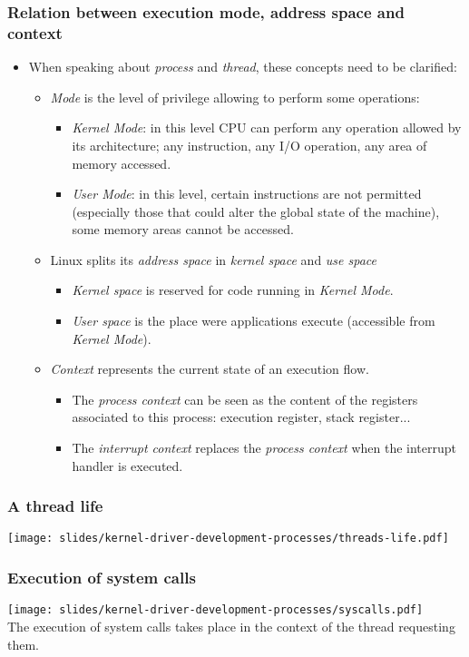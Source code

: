 \begin{frame}
  \frametitle{Relation between execution mode, address space and context}
  \begin{itemize}
  \item When speaking about \emph{process} and \emph{thread}, these
    concepts need to be clarified:
    \begin{itemize}
    \item \emph{Mode} is the level of privilege allowing to perform
      some operations:
      \begin{itemize}
      \item \emph{Kernel Mode}: in this level CPU can perform any
        operation allowed by its architecture; any instruction, any
        I/O operation, any area of memory accessed.
      \item \emph{User Mode}: in this level, certain instructions are
        not permitted (especially those that could alter the global
        state of the machine), some memory areas cannot be accessed.
      \end{itemize}
    \item Linux splits its \emph{address space} in \emph{kernel space}
      and \emph{use space}
      \begin{itemize}
      \item \emph{Kernel space} is reserved for code running in
        \emph{Kernel Mode}.
      \item \emph{User space} is the place were applications execute
        (accessible from \emph{Kernel Mode}).
      \end{itemize}
    \item \emph{Context} represents the current state of an execution flow.
      \begin{itemize}
      \item The \emph{process context} can be seen as the content of
        the registers associated to this process: execution register,
        stack register...
      \item The \emph{interrupt context} replaces the \emph{process
          context} when the interrupt handler is executed.
      \end{itemize}
    \end{itemize}
  \end{itemize}
\end{frame}

\begin{frame}
  \frametitle{A thread life}
  \begin{center}
    \texttt{[image: slides/kernel-driver-development-processes/threads-life.pdf]}
  \end{center}
\end{frame}

\begin{frame}
  \frametitle{Execution of system calls}
  \begin{center}
    \texttt{[image: slides/kernel-driver-development-processes/syscalls.pdf]}\\
    The execution of system calls takes place in the context of the
    thread requesting them.
  \end{center}
\end{frame}

